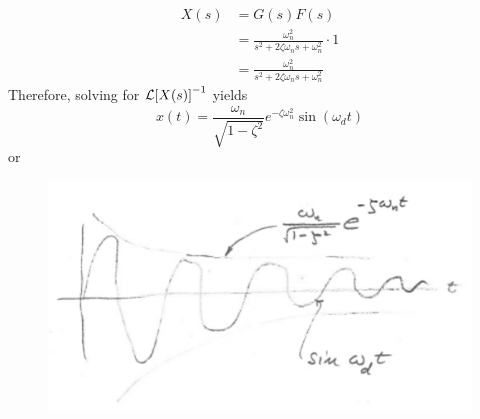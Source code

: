 \documentclass[12pt,letter]{article}
\begin{document}
\begin{align}
X(s) &= G(s)F(s) \\
&= \frac{\omega_n^2}{s^2 + 2 \zeta \omega_n s + \omega_n^2} \cdot 1\nonumber \\
&=  \frac{\omega_n^2}{s^2 + 2 \zeta \omega_n s + \omega_n^2}
\end{align}
Therefore, solving for $\mathcal{L}{\left[X(s)\right]}^{-1}$ yields
\begin{equation}
x(t) = \frac{\omega_n}{\sqrt{1-\zeta^2}} e^{-\zeta \omega_n^2} \sin(\omega_dt)
\end{equation}
or
\begin{figure}[H]
	\centering
	\includegraphics[width=4.5in]{../figures/x_t_impulse_time_response_2nd_order}
\end{figure}
\end{document}
